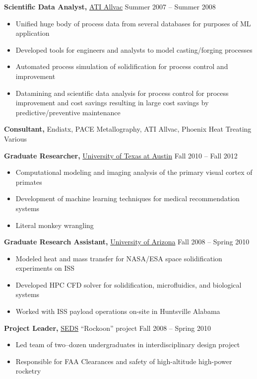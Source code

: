 \documentclass{res}
\begin{document}
\begin{resume}
{\bf Scientific Data Analyst,} \href{https://www.atimetals.com/}{ATI Allvac} \hfill
Summer 2007 -- Summer 2008
\begin{itemize} \itemsep -2pt
  \item Unified huge body of process data from several databases for purposes of ML application
  \item Developed tools for engineers and analysts to model casting/forging processes
  \item Automated process simulation of solidification for process control and improvement
  \item Datamining and scientific data analysis for process control for process improvement and cost savings
    resulting in large cost savings by predictive/preventive maintenance
\end{itemize}

{\bf Consultant,} Endiatx, PACE Metallography, ATI Allvac, Phoenix Heat Treating \hfill Various

{\bf Graduate Researcher,} \href{https://www.utexas.edu/}{University of Texas at Austin} \hfill
Fall 2010 -- Fall 2012
\begin{itemize} \itemsep -2pt
  \item Computational modeling and imaging analysis of the primary visual cortex of primates
  \item Development of machine learning techniques for medical recommendation systems
  \item Literal monkey wrangling
\end{itemize}

{\bf Graduate Research Assistant,} \href{https://www.arizona.edu/}{University of Arizona} \hfill
Fall 2008 -- Spring 2010
\begin{itemize} \itemsep -2pt
  \item Modeled heat and mass transfer for NASA/ESA space solidification experiments on ISS
  \item Developed HPC CFD solver for solidification, microfluidics, and biological systems
  \item Worked with ISS payload operations on-site in Huntsville Alabama 
\end{itemize}

{\bf Project Leader,}  \href{https://seds.arizona.edu/}{SEDS} ``Rockoon''  project \hfill   Fall 2008 -- Spring 2010
\begin{itemize} \itemsep -2pt
  \item Led team of two--dozen undergraduates in interdisciplinary design project
  \item Responsible for FAA Clearances and safety of high-altitude high-power rocketry
\end{itemize}


\end{resume}
\end{document}
